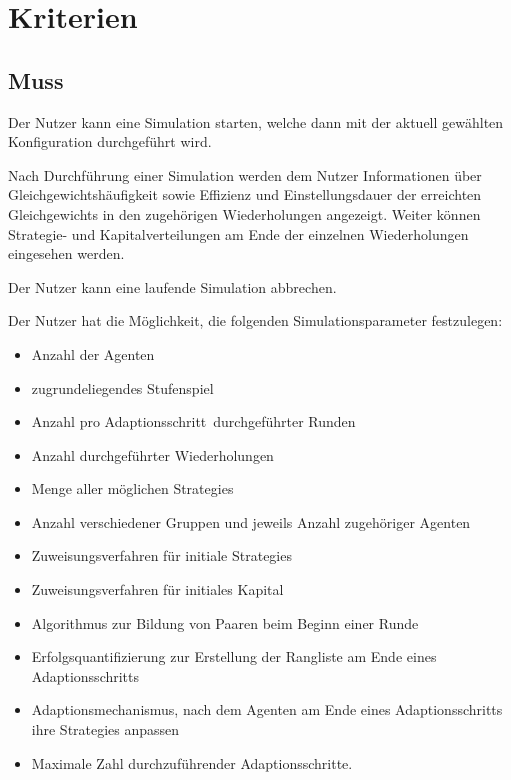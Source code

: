 \documentclass[parskip=full,11pt]{scrartcl}
\def\adapt{Adaptionsschritt}
\def\adapts{Adaptionsschritte}
\begin{document}
\pagebreak
\section{Kriterien}

\subsection{Muss}


Der \Gls{Nutzer} kann eine Simulation starten, welche dann mit der aktuell gewählten \Gls{Konfiguration} durchgeführt wird.


Nach Durchführung einer Simulation werden dem \Gls{Nutzer} Informationen über Gleichgewichtshäufigkeit sowie \Gls{Effizienz} und \Gls{Einstellungsdauer} der erreichten \Glspl{Gleichgewicht} in den zugehörigen Wiederholungen angezeigt. Weiter können Strategie- und Kapitalverteilungen am Ende der einzelnen Wiederholungen eingesehen werden.


Der \Gls{Nutzer} kann eine laufende Simulation abbrechen.


Der \Gls{Nutzer} hat die Möglichkeit, die folgenden Simulationsparameter festzulegen:
\begin{itemize} \itemsep -10pt
\item Anzahl der Agenten
\item zugrundeliegendes \Gls{Stufenspiel}
\item Anzahl pro \adapt\ durchgeführter Runden
\item Anzahl durchgeführter Wiederholungen
\item Menge aller möglichen \Glspl{Strategie}
\item Anzahl verschiedener Gruppen und jeweils Anzahl zugehöriger Agenten
\item Zuweisungsverfahren für initiale \Glspl{Strategie}
\item Zuweisungsverfahren für initiales \Gls{Kapital}
\item Algorithmus zur Bildung von Paaren beim Beginn einer Runde
\item Erfolgsquantifizierung zur Erstellung der Rangliste am Ende eines \adapt s
\item Adaptionsmechanismus, nach dem Agenten am Ende eines \adapt s ihre \Glspl{Strategie} anpassen
\item Maximale Zahl durchzuführender \adapts.
\end{itemize}
\end{document}
